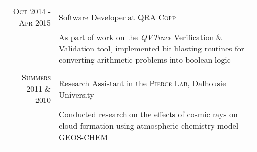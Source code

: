 \documentclass[a4paper,12pt]{article} %
\begin{document}
\begin{tabular}{r|p{11cm}}

\textsc{Oct 2014 - Apr 2015} & Software Developer at \textsc{QRA Corp}\\
& \footnotesize{ As part of work on the \emph{QVTrace} Verification \& Validation tool, implemented bit-blasting routines for converting arithmetic problems into boolean logic } \\
\multicolumn{2}{c}{} \\

\textsc{Summers 2011 \& 2010} & Research Assistant in the \textsc{Pierce Lab}, Dalhousie University  \\
& \footnotesize{ Conducted research on the effects of cosmic rays on cloud formation using atmospheric chemistry model GEOS-CHEM } \\
\multicolumn{2}{c}{} \\




\end{tabular}
\end{document}
